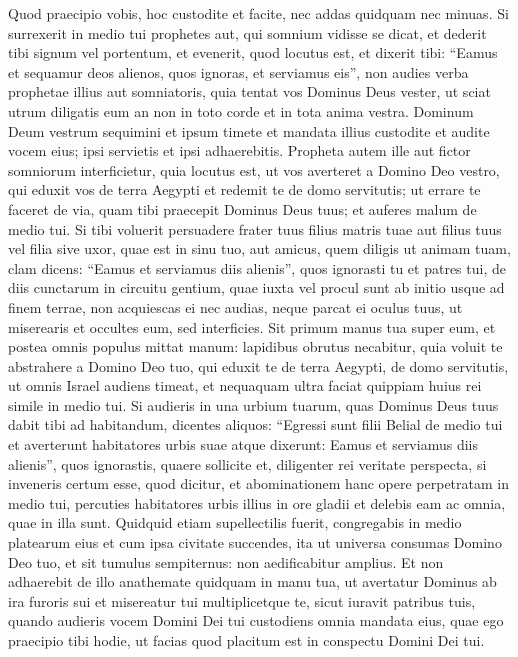 \begin{biblechapter}
\begin{biblechapter}
\begin{biblechapter}
\begin{biblechapter}
\begin{biblechapter}
\begin{biblechapter}
\begin{biblechapter}
\begin{biblechapter}
\begin{biblechapter}
\begin{biblechapter}
\begin{biblechapter}
\begin{biblechapter}
\begin{biblechapter}
\verse Quod praecipio vobis, hoc custodite et facite, nec addas quidquam nec minuas. 
\verse Si surrexerit in medio tui prophetes aut, qui somnium vidisse se dicat, et dederit tibi signum vel portentum, 
\verse et evenerit, quod locutus est, et dixerit tibi: “Eamus et sequamur deos alienos, quos ignoras, et serviamus eis”, 
\verse non audies verba prophetae illius aut somniatoris, quia tentat vos Dominus Deus vester, ut sciat utrum diligatis eum an non in toto corde et in tota anima vestra. 
\verse Dominum Deum vestrum sequimini et ipsum timete et mandata illius custodite et audite vocem eius; ipsi servietis et ipsi adhaerebitis. 
\verse Propheta autem ille aut fictor somniorum interficietur, quia locutus est, ut vos averteret a Domino Deo vestro, qui eduxit vos de terra Aegypti et redemit te de domo servitutis; ut errare te faceret de via, quam tibi praecepit Dominus Deus tuus; et auferes malum de medio tui.
 \verse Si tibi voluerit persuadere frater tuus filius matris tuae aut filius tuus vel filia sive uxor, quae est in sinu tuo, aut amicus, quem diligis ut animam tuam, clam dicens: “Eamus et serviamus diis alienis”, quos ignorasti tu et patres tui, 
 \verse de diis cunctarum in circuitu gentium, quae iuxta vel procul sunt ab initio usque ad finem terrae, 
\verse non acquiescas ei nec audias, neque parcat ei oculus tuus, ut miserearis et occultes eum, 
\verse sed interficies. Sit primum manus tua super eum, et postea omnis populus mittat manum: 
\verse lapidibus obrutus necabitur, quia voluit te abstrahere a Domino Deo tuo, qui eduxit te de terra Aegypti, de domo servitutis, 
\verse ut omnis Israel audiens timeat, et nequaquam ultra faciat quippiam huius rei simile in medio tui.
 \verse Si audieris in una urbium tuarum, quas Dominus Deus tuus dabit tibi ad habitandum, dicentes aliquos: 
\verse “Egressi sunt filii Belial de medio tui et averterunt habitatores urbis suae atque dixerunt: Eamus et serviamus diis alienis”, quos ignorastis, 
\verse quaere sollicite et, diligenter rei veritate perspecta, si inveneris certum esse, quod dicitur, et abominationem hanc opere perpetratam in medio tui, 
\verse percuties habitatores urbis illius in ore gladii et delebis eam ac omnia, quae in illa sunt. 
\verse Quidquid etiam supellectilis fuerit, congregabis in medio platearum eius et cum ipsa civitate succendes, ita ut universa consumas Domino Deo tuo, et sit tumulus sempiternus: non aedificabitur amplius. 
\verse Et non adhaerebit de illo anathemate quidquam in manu tua, ut avertatur Dominus ab ira furoris sui et misereatur tui multiplicetque te, sicut iuravit patribus tuis, 
\verse quando audieris vocem Domini Dei tui custodiens omnia mandata eius, quae ego praecipio tibi hodie, ut facias quod placitum est in conspectu Domini Dei tui.
 

\end{biblechapter}
\end{biblechapter}
\end{biblechapter}
\end{biblechapter}
\end{biblechapter}
\end{biblechapter}
\end{biblechapter}
\end{biblechapter}
\end{biblechapter}
\end{biblechapter}
\end{biblechapter}
\end{biblechapter}
\end{biblechapter}
